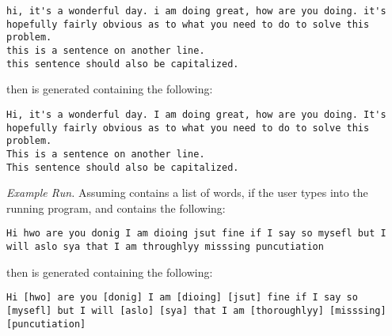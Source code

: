    \begin{verbatim}
hi, it's a wonderful day. i am doing great, how are you doing. it's 
hopefully fairly obvious as to what you need to do to solve this problem.
this is a sentence on another line.
this sentence should also be capitalized.
    \end{verbatim}

    then  is generated containing the following:

    \begin{verbatim}
Hi, it's a wonderful day. I am doing great, how are you doing. It's 
hopefully fairly obvious as to what you need to do to solve this problem.
This is a sentence on another line.
This sentence should also be capitalized.
    \end{verbatim}


    \textit{Example Run.} Assuming  contains a list of words, if the user types  into the running program, and  contains the following:

    \begin{verbatim}
Hi hwo are you donig I am dioing jsut fine if I say so mysefl but I 
will aslo sya that I am throughlyy misssing puncutiation
    \end{verbatim}

    then  is generated containing the following:

    \begin{verbatim}
Hi [hwo] are you [donig] I am [dioing] [jsut] fine if I say so 
[mysefl] but I will [aslo] [sya] that I am [thoroughlyy] [misssing] 
[puncutiation]
    \end{verbatim}
